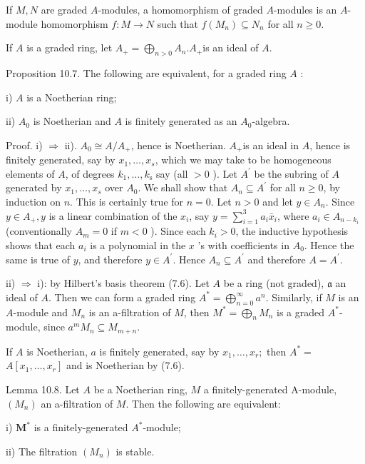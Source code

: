 \documentclass{standalone}
\theoremstyle{definition}
\theoremstyle{remark}
\begin{document}
If $M, N$ are graded $A$-modules, a homomorphism of graded $A$-modules is an $A$-module homomorphism $f: M \rightarrow N$ such that $f\left(M_{n}\right) \subseteq N_{n}$ for all $n \geqslant 0$.

If $A$ is a graded ring, let $A_{+}=\bigoplus_{n>0} A_{n} . A_{+}$is an ideal of $A$.

Proposition 10.7. The following are equivalent, for a graded ring $A$ :

i) $A$ is a Noetherian ring;

ii) $A_{0}$ is Noetherian and $A$ is finitely generated as an $A_{0}$-algebra.

Proof. i) $\Rightarrow$ ii). $A_{0} \cong A / A_{+}$, hence is Noetherian. $A_{+}$is an ideal in $A$, hence is finitely generated, say by $x_{1}, \ldots, x_{s}$, which we may take to be homogeneous elements of $A$, of degrees $k_{1}, \ldots, k_{\mathrm{s}}$ say (all $>0$ ). Let $A^{\prime}$ be the subring of $A$ generated by $x_{1}, \ldots, x_{s}$ over $A_{0}$. We shall show that $A_{n} \subseteq A^{\prime}$ for all $n \geqslant 0$, by induction on $n$. This is certainly true for $n=0$. Let $n>0$ and let $y \in A_{n}$. Since $y \in A_{+}, y$ is a linear combination of the $x_{i}$, say $y=\sum_{i=1}^{3} a_{i} \bar{x}_{i}$, where $a_{i} \in A_{n-k_{i}}$ (conventionally $A_{m}=0$ if $m<0$ ). Since each $k_{i}>0$, the inductive hypothesis shows that each $a_{i}$ is a polynomial in the $x$ 's with coefficients in $A_{0}$. Hence the same is true of $y$, and therefore $y \in A^{\prime}$. Hence $A_{n} \subseteq A^{\prime}$ and therefore $A=A^{\prime}$.

ii) $\Rightarrow$ i): by Hilbert's basis theorem (7.6). Let $A$ be a ring (not graded), $\mathfrak{a}$ an ideal of $A$. Then we can form a graded ring $A^{*}=\bigoplus_{n=0}^{\infty} a^{n}$. Similarly, if $M$ is an $A$-module and $M_{n}$ is an a-filtration of $M$, then $M^{*}=\bigoplus_{n} M_{n}$ is a graded $A^{*}$-module, since $a^{m} M_{n} \subseteq M_{m+n}$.

If $A$ is Noetherian, $a$ is finitely generated, say by $x_{1}, \ldots, x_{r} ;$ then $A^{*}=$ $A\left[x_{1}, \ldots, x_{r}\right]$ and is Noetherian by (7.6).

Lemma 10.8. Let $A$ be a Noetherian ring, $M$ a finitely-generated A-module, $\left(M_{n}\right)$ an a-filtration of $M$. Then the following are equivalent:

i) $\boldsymbol{M}^{*}$ is a finitely-generated $A^{*}$-module;

ii) The filtration $\left(M_{n}\right)$ is stable.
\end{document}

